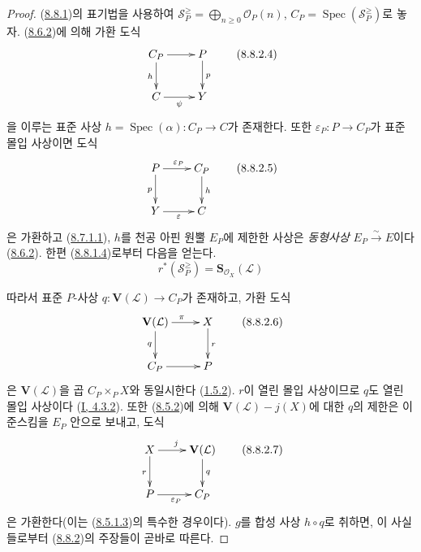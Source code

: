 \begin{proof}
(\hyperref[II.8.8.1-ko]{8.8.1})의 표기법을 사용하여
$\mathcal{S}_P^{\geqslant}=\bigoplus_{n\geqslant 0}\mathcal{O}_P(n)$,
$C_P=\operatorname{Spec}(\mathcal{S}_P^{\geqslant})$로 놓자.
(\hyperref[II.8.6.2-ko]{8.6.2})에 의해 가환 도식
\begin{equation}
\label{II.8.8.2.4-ko}
  \xymatrix{
    C_P\ar[r]\ar[d]_{h} & P\ar[d]^{p}\\
    C\ar[r]_{\psi} & Y
  }
\tag{8.8.2.4}
\end{equation}
을 이루는 표준 사상 $h=\operatorname{Spec}(\alpha):C_P\to C$가 존재한다.
또한 $\varepsilon_P:P\to C_P$가 표준 몰입 사상이면 도식
\begin{equation}
\label{II.8.8.2.5-ko}
  \xymatrix{
    P\ar[r]^{\varepsilon_P}\ar[d]_{p} & C_P\ar[d]^{h}\\
    Y\ar[r]_{\varepsilon} & C
  }
\tag{8.8.2.5}
\end{equation}
은 가환하고 (\hyperref[II.8.7.1.1-ko]{8.7.1.1}), $h$를 천공 아핀
원뿔 $E_P$에 제한한 사상은 \emph{동형사상}
$E_P\xrightarrow{\sim}E$이다 (\hyperref[II.8.6.2-ko]{8.6.2}). 한편
(\hyperref[II.8.8.1.4-ko]{8.8.1.4})로부터 다음을 얻는다.
\[
  r^*(\mathcal{S}_P^{\geqslant})=
  \mathbf{S}_{\mathcal{O}_X}(\mathcal{L})
\]

따라서 표준 $P$-사상 $q:\mathbf{V}(\mathcal{L})\to C_P$가 존재하고,
가환 도식
\begin{equation}
\label{II.8.8.2.6-ko}
  \xymatrix{
    \mathbf{V}(\mathcal{L})\ar[r]^{\pi}\ar[d]_{q} & X\ar[d]^{r}\\
    C_P\ar[r] & P
  }
\tag{8.8.2.6}
\end{equation}
은 $\mathbf{V}(\mathcal{L})$을 곱 $C_P\times_P X$와 동일시한다
(\hyperref[II.1.5.2-ko]{1.5.2}). $r$이 열린 몰입 사상이므로 $q$도
열린 몰입 사상이다 (\hyperref[I.4.3.2-ko]{I, 4.3.2}). 또한
(\hyperref[II.8.5.2-ko]{8.5.2})에 의해
$\mathbf{V}(\mathcal{L})-j(X)$에 대한 $q$의 제한은 이 준스킴을
$E_P$ 안으로 보내고, 도식
\begin{equation}
\label{II.8.8.2.7-ko}
  \xymatrix{
    X\ar[r]^{j}\ar[d]_{r} & \mathbf{V}(\mathcal{L})\ar[d]^{q}\\
    P\ar[r]_{\varepsilon_P} & C_P
  }
\tag{8.8.2.7}
\end{equation}
은 가환한다(이는
(\hyperref[II.8.5.1.3-ko]{8.5.1.3})의 특수한 경우이다).
$g$를 합성 사상 $h\circ q$로 취하면, 이 사실들로부터
(\hyperref[II.8.8.2-ko]{8.8.2})의 주장들이 곧바로 따른다.
\end{proof}

